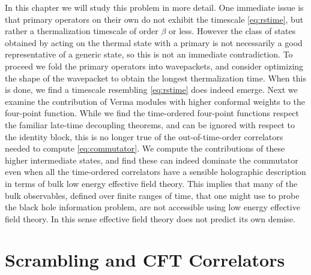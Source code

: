 \documentclass{brownthesis}
\begin{document}
In this chapter we will study this problem in more detail. One immediate
issue is that primary operators on their own do not exhibit the timescale
\eqref{eq:rstime}, but rather a thermalization timescale of order
$\beta$ or less. However the class of states obtained by acting on
the thermal state with a primary is not necessarily a good representative
of a generic state, so this is not an immediate contradiction. To
proceed we fold the primary operators into wavepackets, and consider
optimizing the shape of the wavepacket to obtain the longest thermalization
time. When this is done, we find a timescale resembling \eqref{eq:rstime}
does indeed emerge. Next we examine the contribution of Verma modules
with higher conformal weights to the four-point function. While we
find the time-ordered four-point functions respect the familiar late-time
decoupling theorems, and can be ignored with respect to the identity
block, this is no longer true of the out-of-time-order correlators
needed to compute \eqref{eq:commutator}. We compute the contributions
of these higher intermediate states, and find these can indeed dominate
the commutator even when all the time-ordered correlators have a sensible
holographic description in terms of bulk low energy effective field
theory. This implies that many of the bulk observables, defined over
finite ranges of time, that one might use to probe the black hole
information problem, are not accessible using low energy effective
field theory. In this sense effective field theory does not predict
its own demise.

\section{Scrambling and CFT Correlators}
\end{document}
